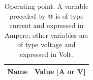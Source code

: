 \begin{table}[hp]
\centering
  \begin{tabular}{|l|r|}
    \hline    
    {\bf Name} & {\bf Value [A or V]} \\ \hline
   
 \end{tabular}
  \caption{Operating point. A variable preceded by @ is of type current and expressed in Ampere; other variables are of type voltage and expressed in Volt.} 
  \label{tab:op}
\end{table}





